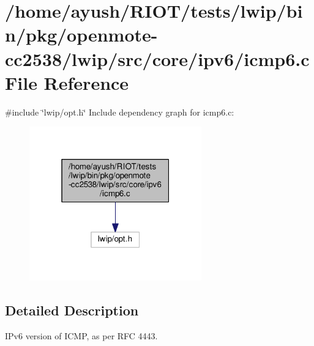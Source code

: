 \hypertarget{openmote-cc2538_2lwip_2src_2core_2ipv6_2icmp6_8c}{}\section{/home/ayush/\+R\+I\+O\+T/tests/lwip/bin/pkg/openmote-\/cc2538/lwip/src/core/ipv6/icmp6.c File Reference}
\label{openmote-cc2538_2lwip_2src_2core_2ipv6_2icmp6_8c}
{\ttfamily \#include \char`\"{}lwip/opt.\+h\char`\"{}}\newline
Include dependency graph for icmp6.\+c\+:
\nopagebreak
\begin{figure}[H]
\begin{center}
\leavevmode
\includegraphics[width=211pt]{openmote-cc2538_2lwip_2src_2core_2ipv6_2icmp6_8c__incl}
\end{center}
\end{figure}


\subsection{Detailed Description}
I\+Pv6 version of I\+C\+MP, as per R\+FC 4443. 